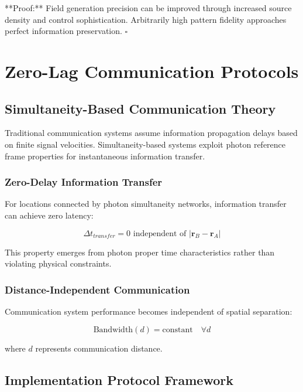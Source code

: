 \documentclass[12pt,a4paper]{article}
\begin{document}
**Proof:** Field generation precision can be improved through increased source density and control sophistication. Arbitrarily high pattern fidelity approaches perfect information preservation. $\square$

\section{Zero-Lag Communication Protocols}

\subsection{Simultaneity-Based Communication Theory}

Traditional communication systems assume information propagation delays based on finite signal velocities. Simultaneity-based systems exploit photon reference frame properties for instantaneous information transfer.

\subsubsection{Zero-Delay Information Transfer}

For locations connected by photon simultaneity networks, information transfer can achieve zero latency:

\begin{equation}
\Delta t_{transfer} = 0 \text{ independent of } |\mathbf{r}_B - \mathbf{r}_A|
\label{eq:zero_delay_transfer}
\end{equation}

This property emerges from photon proper time characteristics rather than violating physical constraints.

\subsubsection{Distance-Independent Communication}

Communication system performance becomes independent of spatial separation:

\begin{equation}
\text{Bandwidth}(d) = \text{constant} \quad \forall d
\label{eq:distance_independent_bandwidth}
\end{equation}

where $d$ represents communication distance.

\subsection{Implementation Protocol Framework}
\end{document}
